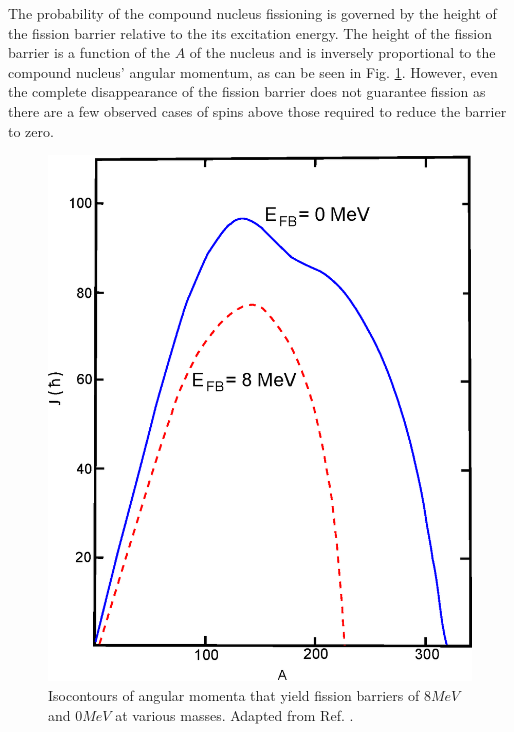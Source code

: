 The probability of the compound nucleus fissioning is governed by the height of the fission barrier relative to the its excitation energy. The height of the fission barrier is a function of the $A$ of the nucleus and is inversely proportional to the compound nucleus' angular momentum, as can be seen in Fig. \ref{fig:chp3-fission-barrier}. However, even the complete disappearance of the fission barrier does not guarantee fission as there are a few observed cases of spins above those required to reduce the barrier to zero\cite{hyperdef,hyperdef2}.

\begin{figure}[h!]
	\centerline{\includegraphics[height=0.3\textheight]{./img/c3/fission_barrier.eps}}
	\caption{Isocontours of angular momenta that yield fission barriers of $8MeV$ and $0MeV$ at various masses. Adapted from Ref. \cite{fissionBarrier2}.}
	\label{fig:chp3-fission-barrier}
\end{figure}


